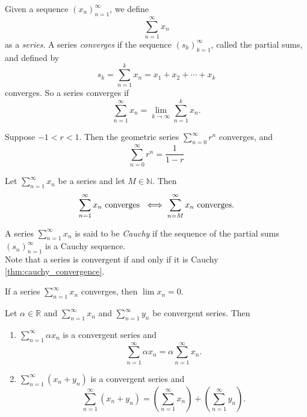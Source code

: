\documentclass[../main.tex]{subfiles}
\begin{document}
    \begin{definition}[Series]\label{def:series}
    Given a sequence $ (x_n)^\infty_{n=1}$, we define
    \[
    \sum_{n=1}^\infty{x_n}
    \]
    as a \textit{series}. A series \textit{converges} if the sequence $ (s_k)^\infty_{k=1}$, called the partial sums, and defined by
    \[
    s_k = \sum_{n = 1}^k{x_n} = x_1 + x_2 + \cdots + x_k
    \]
    converges. So a series converges if
    \[
    \sum_{n=1}^\infty{x_n} = \lim_{k \to \infty}{\sum_{n = 1}^k{x_n}}.
    \]
    \end{definition}
    
    
    
    
    
    \begin{proposition}\label{prp:geo_series}
    Suppose $ -1 < r < 1.$ Then the geometric series $ \sum_{n=0}^\infty{r^n}$ converges, and 
    \[
    \sum_{n=0}^\infty{r^n} = \frac{1}{1-r}
    \]
    \end{proposition}
    
    
    
    
    
    
    \begin{exercise}
    Let $\sum_{n=1}^\infty{x_n}$ be a series and let $M \in \mathbb{N}$. Then
    \[
    \sum_{n=1}^\infty{x_n} \textnormal{ converges } \iff \sum_{n=M}^\infty{x_n} \textnormal{ converges.}
    \]
    \end{exercise}
    
    
    \begin{definition}
    A series $\sum_{n=1}^\infty{x_n}$ is said to be \textit{Cauchy} if the sequence of the partial sums $ (s_n)^\infty_{n=1}$ is a Cauchy sequence.\\
    Note that a series is convergent if and only if it is Cauchy \ref{thm:cauchy_convergence}.
    \end{definition}
    
    
    
    
    \begin{exercise}
    If a series $\sum_{n=1}^\infty{x_n}$ converges, then $\lim{x_n} = 0.$
    \end{exercise}
    
    
    
    
    
    
    \begin{proposition}\label{prp:linearity_series}
    Let $\alpha \in \mathbb{R}$ and $\sum_{n=1}^{\infty} x_n$ and $\sum_{n=1}^{\infty} y_n$ be convergent series. Then
    \begin{enumerate}
        \item $\sum_{n=1}^{\infty} \alpha x_n$ is a convergent series and
        \[
        \sum_{n=1}^{\infty} \alpha x_n = \alpha \sum_{n=1}^{\infty} x_n.
        \]
        \item $\sum_{n=1}^{\infty} (x_n + y_n)$ is a convergent series and
        \[
        \sum_{n=1}^{\infty} (x_n + y_n) = \left( \sum_{n=1}^{\infty} x_n \right) + \left( \sum_{n=1}^{\infty} y_n \right).
        \]
    \end{enumerate}
    
    \end{proposition}
    
\end{document}
